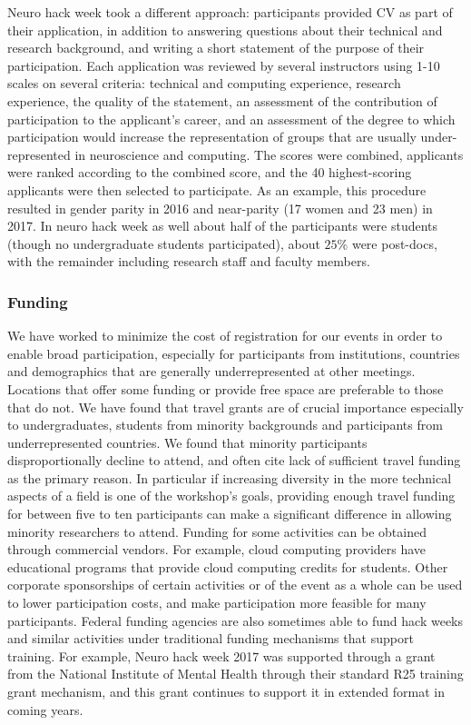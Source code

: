 \documentclass{aastex62}
\begin{document}
Neuro hack week took a different approach: participants provided CV as part of their application, in addition to answering questions about their technical and research background, and writing a short statement of the purpose of their participation. Each application was reviewed by several instructors using 1-10 scales on several criteria: technical and computing experience, research experience, the quality of the statement, an assessment of the contribution of participation to the applicant's career, and an assessment of the degree to which participation would increase the representation of groups that are usually under-represented in neuroscience and computing. The scores were combined, applicants were ranked according to the combined score, and the 40 highest-scoring applicants were then selected to participate. As an example,  this procedure resulted in gender parity in 2016 and near-parity (17 women and 23 men) in 2017. In neuro hack week as well about half of the participants were students (though no undergraduate students participated), about $25\%$ were post-docs, with the remainder including research staff and faculty members.

\subsubsection{Funding}

We have worked to minimize the cost of registration for our events in order to enable broad participation, especially for participants from institutions, countries and demographics that are generally underrepresented at other meetings. Locations that offer some funding or provide free space are preferable to those that do not.
We have found that travel grants are of crucial importance especially to undergraduates, students from minority backgrounds and participants from underrepresented countries. We found that minority participants disproportionally decline to attend, and often cite lack of sufficient travel funding as the primary reason. In particular if increasing diversity in the more technical aspects of a field is one of the workshop's goals, providing enough travel funding for between five to ten participants can make a significant difference in allowing minority researchers to attend.
Funding for some activities can be obtained through commercial vendors.
For example, cloud computing providers have educational programs that provide cloud computing credits for students.
Other corporate sponsorships of certain activities or of the event as a whole can be used to lower participation costs, and make participation more feasible for many participants.
Federal funding agencies are also sometimes able to fund hack weeks and similar activities under traditional funding mechanisms that support training. For example, Neuro hack week 2017 was supported through a grant from the National Institute of Mental Health through their standard R25 training grant mechanism, and this grant continues to support it in extended format in coming years.
\end{document}
